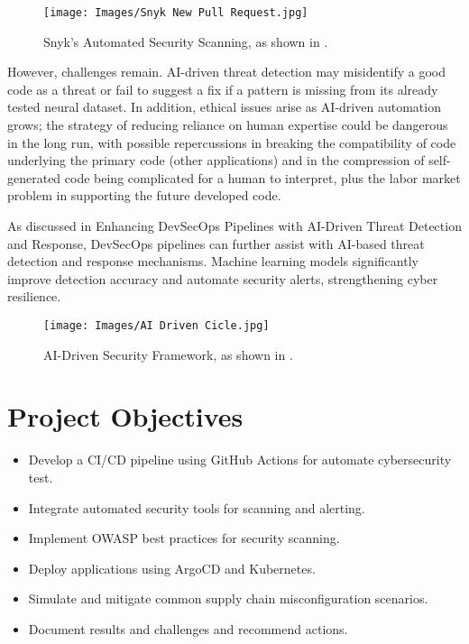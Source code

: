\documentclass[conference]{IEEEtran}
\begin{document}
\begin{figure}[h!] 
    \centering 
    \texttt{[image: Images/Snyk New Pull Request.jpg]} 
    \caption{Snyk's Automated Security Scanning, as shown in \cite{Snyk2024}.} 
    \label{fig:Snyk New Pull Request} 
\end{figure}

However, challenges remain. AI-driven threat detection may misidentify a good code as a threat or fail to suggest a fix if a pattern is missing from its already tested neural dataset. In addition, ethical issues arise as AI-driven automation grows; the strategy of reducing reliance on human expertise could be dangerous in the long run, with possible repercussions in breaking the compatibility of code underlying the primary code (other applications) and in the compression of self-generated code being complicated for a human to interpret, plus the labor market problem in supporting the future developed code.

As discussed in \cite{Yulianto2024} Enhancing DevSecOps Pipelines with AI-Driven Threat Detection and Response, DevSecOps pipelines can further assist with AI-based threat detection and response mechanisms. Machine learning models significantly improve detection accuracy and automate security alerts, strengthening cyber resilience.

\begin{figure}[h!] 
    \centering 
    \texttt{[image: Images/AI Driven Cicle.jpg]} 
    \caption{AI-Driven Security Framework, as shown in \cite{Yulianto2024}.} 
    \label{fig:AI Driven Cicle} 
\end{figure}

\section{Project Objectives}
\begin{itemize}
    \item Develop a CI/CD pipeline using GitHub Actions for automate cybersecurity test.
    \item Integrate automated security tools for scanning and alerting.
    \item Implement OWASP best practices for security scanning.
    \item Deploy applications using ArgoCD and Kubernetes.
    \item Simulate and mitigate common supply chain misconfiguration scenarios.
    \item Document results and challenges and recommend actions.
\end{itemize}
\end{document}
